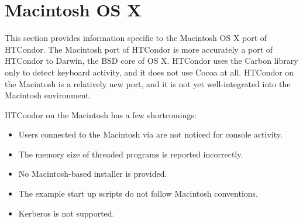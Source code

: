 \section{Macintosh OS X}\label{sec:platform-macos}

This section provides information specific to the Macintosh OS X port of
HTCondor.
The Macintosh port of HTCondor is more accurately a port of HTCondor to
Darwin, the BSD core of OS X. HTCondor uses the Carbon library only to
detect keyboard activity, and it does not use Cocoa at all.
HTCondor on the Macintosh is a relatively new port, and it 
is not yet well-integrated
into the Macintosh environment. 

HTCondor on the Macintosh has a few shortcomings:
\begin{itemize}
\item Users connected to the Macintosh via  are not
noticed for console activity.
\item The memory size of threaded programs is reported incorrectly.
\item No Macintosh-based installer is provided.
\item The example start up scripts do not follow Macintosh conventions.
\item Kerberos is not supported.
\end{itemize}

